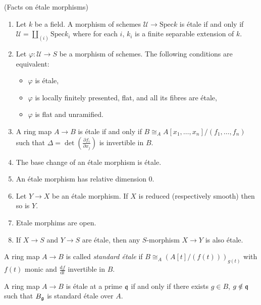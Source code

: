 \begin{proposition}
\label{proposition-etale-morphisms}
(Facts on \'etale morphisms)
\begin{enumerate}
\item
Let $k$ be a field. A morphism of schemes $\mathcal{U} \to \text{Spec} k$ is
\'etale if and only if $\mathcal{U} = \coprod_{(i)} \text{Spec} k_i$ where for
each $i$, $k_i$ is a finite separable extension of $k$.
\item
Let $\varphi : \mathcal{U} \to S$ be a morphism of schemes. The following
conditions are equivalent:
\begin{itemize}
\item $\varphi$ is \'etale,
\item $\varphi$ is locally finitely presented, flat, and all its fibres are
\'etale,
\item $\varphi$ is flat and unramified.
\end{itemize}
\item
A ring map $A \to B$ is \'etale if and only if $B \cong_A A[x_1,
\dots,x_n]/(f_1,\dots,f_n)$ such that $\Delta = \det \left( \frac{\partial
f_i}{\partial x_j} \right) $ is invertible in $B$.
\item
The base change of an \'etale morphism is \'etale.
\item
An \'etale morphism has relative dimension 0.
\item
Let $Y \to X$ be an \'etale morphism. If $X$ is reduced (respectively smooth)
then so is $Y$.
\item
Etale morphims are open.
\item
If $X\to S$ and $Y\to S$ are \'etale, then any $S$-morphism $X \to Y$ is also
\'etale.
\end{enumerate}
\end{proposition}

\begin{definition}
\label{definition-standard-etale}
A ring map $A \to B$ is called {\it standard \'etale} if $B \cong_A \left(
A[t]/(f(t)) \right)_{g(t)}$ with $f(t)$ monic and
$\frac{\mathrm{d}f}{\mathrm{d}t}$ invertible in $B$.
\end{definition}

\begin{theorem}
\label{theorem-standard-etale}
A ring map $A \to B$ is \'etale at a prime $\frak q$ if and only if there
exists $g \in B$, $g \notin \frak q$ such that $B_{\frak g}$ is standard
\'etale over $A$.
\end{theorem}





